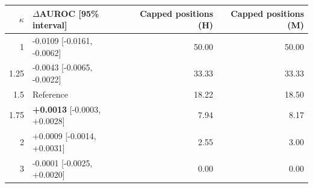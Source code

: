 \begin{tabular}{@{}rlrr@{}}
\toprule
$\kappa$ & $\Delta$AUROC [95\% interval] & Capped positions (H) & Capped positions (M) \\
\midrule
1 & -0.0109 [-0.0161, -0.0062] & 50.00 & 50.00 \\
1.25 & -0.0043 [-0.0065, -0.0022] & 33.33 & 33.33 \\
1.5 & Reference & 18.22 & 18.50 \\
1.75 & \textbf{+0.0013} [-0.0003, +0.0028] & 7.94 & 8.17 \\
2 & +0.0009 [-0.0014, +0.0031] & 2.55 & 3.00 \\
3 & -0.0001 [-0.0025, +0.0020] & 0.00 & 0.00 \\
\bottomrule
\end{tabular}

